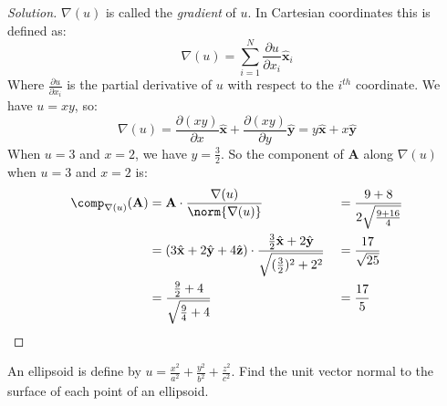 \documentclass[crop=false,class=article,oneside]{standalone}
\begin{document}
        \begin{proof}[Solution]
            $\nabla(u)$ is called the \textit{gradient} of $u$.
            In Cartesian coordinates this is defined as:
            \begin{equation*}
                \nabla(u)=\sum_{i=1}^{N}\frac{\partial u}
                    {\partial x_{i}}\hat{\mathbf{x}}_{i}
            \end{equation*}
            Where $\frac{\partial u}{\partial x_{i}}$
            is the partial derivative
            of $u$ with respect to the $i^{th}$ coordinate.
            We have $u=xy$, so:
            \begin{equation*}
                \nabla(u)
                =\frac{\partial(xy)}{\partial x}\hat{\mathbf{x}}
                +\frac{\partial(xy)}{\partial y}\hat{\mathbf{y}}
                =y\hat{\mathbf{x}}+x\hat{\mathbf{y}}
            \end{equation*}
            When $u=3$ and $x=2$, we have $y=\frac{3}{2}$.
            So the component of $\mathbf{A}$ along $\nabla(u)$
            when $u=3$ and $x=2$ is:
            \begin{align*}
                \comp_{\nabla(u)}(\mathbf{A})
                &=
                \mathbf{A}\cdot\frac{\nabla(u)}{\norm{\nabla(u)}}
                &
                &=\frac{9+8}{2\sqrt{\frac{9+16}{4}}}\\
                &=
                (3\hat{\mathbf{x}}
                +2\hat{\mathbf{y}}
                +4\hat{\mathbf{z}})
                \cdot
                \frac{%
                    \frac{3}{2}\hat{\mathbf{x}}%
                    +2\hat{\mathbf{y}}%
                }{%
                    \sqrt{(\frac{3}{2})^{2}+2^{2}}%
                }
                &
                &=\frac{17}{\sqrt{25}}\\
                &=\frac{\frac{9}{2}+4}{\sqrt{\frac{9}{4}+4}}
                &
                &=\frac{17}{5}\\
            \end{align*}
        \end{proof}
        \begin{problem}[Wangsness 1-9]
            An ellipsoid is define by
            $u%
             =\frac{x^{2}}{a^{2}}%
             +\frac{y^{2}}{b^{2}}%
             +\frac{z^{2}}{c^{2}}$.
            Find the unit vector normal to the
            surface of each point of an
            ellipsoid.
        \end{problem}
\end{document}
